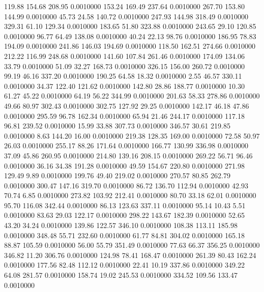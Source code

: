  119.88  154.68  208.95   0.0010000
 153.24  169.49  237.64   0.0010000
 267.70  153.80  144.99   0.0010000
  45.73   24.58  140.72   0.0010000
 247.93  144.98  318.49   0.0010000
 329.31   61.10  129.34   0.0010000
 183.65   51.80  323.88   0.0010000
 243.65   29.10  120.85   0.0010000
  96.77   64.49  138.08   0.0010000
  40.24   22.13   98.76   0.0010000
 186.95   78.83  194.09   0.0010000
 241.86  146.03  194.69   0.0010000
 118.50  162.51  274.66   0.0010000
 212.22  116.99  248.68   0.0010000
 141.60  107.84  261.46   0.0010000
 174.09  134.06   33.79   0.0010000
  51.09   32.27  168.73   0.0010000
 326.15  156.00  260.72   0.0010000
  99.19   46.16  337.20   0.0010000
 190.25   64.58   18.32   0.0010000
   2.55   46.57  330.11   0.0010000
  34.37  122.40  121.62   0.0010000
 142.80   28.86  188.77   0.0010000
  10.30   61.27   45.22   0.0010000
  64.19   56.22  344.99   0.0010000
 201.63   58.33  278.86   0.0010000
  49.66   80.97  302.43   0.0010000
 302.75  127.92   29.25   0.0010000
 142.17   46.18   47.86   0.0010000
 295.59   96.78  162.34   0.0010000
  65.94   21.46  244.17   0.0010000
 117.18   96.81  239.52   0.0010000
  15.99   33.88  307.73   0.0010000
 346.57   30.61  219.85   0.0010000
   8.63  144.20   16.00   0.0010000
 219.38  128.35  169.00   0.0010000
  72.58   50.97   26.03   0.0010000
 255.17   88.26  171.64   0.0010000
 166.77  130.99  336.98   0.0010000
  37.09   45.86  260.95   0.0010000
 214.80  139.16  208.15   0.0010000
 269.22   56.71   96.46   0.0010000
  36.16   34.38  191.28   0.0010000
  49.59  154.67  220.80   0.0010000
 271.98  129.49    9.89   0.0010000
 199.76   49.40  219.02   0.0010000
 270.57   80.85  262.79   0.0010000
 300.47  147.16  319.70   0.0010000
  86.72  136.70  112.94   0.0010000
  42.93   70.74    6.85   0.0010000
 273.82  103.92  212.41   0.0010000
  80.70   33.18   62.01   0.0010000
  95.70  116.08  342.44   0.0010000
  86.13  123.63  337.11   0.0010000
  95.14   10.43    5.51   0.0010000
  83.63   29.03  122.17   0.0010000
 298.22  143.67  182.39   0.0010000
  52.65   43.20   34.24   0.0010000
 139.86  122.57  346.10   0.0010000
 108.38  113.11  185.98   0.0010000
 348.48   55.71  232.60   0.0010000
  61.77   84.81  304.02   0.0010000
 165.18   88.87  105.59   0.0010000
  56.00   55.79  351.49   0.0010000
  77.63   66.37  356.25   0.0010000
 346.82   11.20  306.76   0.0010000
 124.98   78.41  168.47   0.0010000
 261.39   80.43  162.24   0.0010000
 177.56   82.48  112.12   0.0010000
  22.41   10.19  337.86   0.0010000
 349.22   64.08  281.57   0.0010000
 158.74   19.02  245.53   0.0010000
 334.52  109.56  133.47   0.0010000
